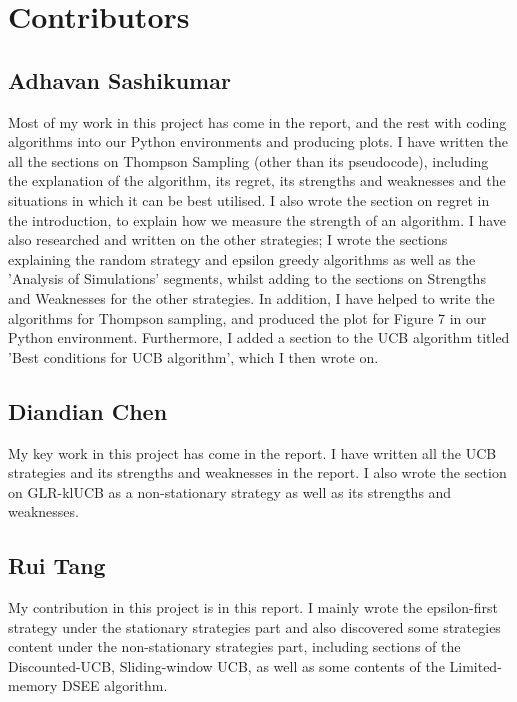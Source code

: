 \section{Contributors}\label{sec:contributors}

\subsection{Adhavan Sashikumar}\label{subsec:adhavan-sashikumar}
Most of my work in this project has come in the report, and the rest with coding algorithms into our Python environments and producing plots.
I have written the all the sections on Thompson Sampling (other than its pseudocode), including the explanation of the algorithm, its regret, its strengths and weaknesses and the situations in which it can be best utilised.
I also wrote the section on regret in the introduction, to explain how we measure the strength of an algorithm.
I have also researched and written on the other strategies;
I wrote the sections explaining the random strategy and epsilon greedy algorithms as well as the 'Analysis of Simulations' segments, whilst adding to the sections on Strengths and Weaknesses for the other strategies.
In addition, I have helped to write the algorithms for Thompson sampling, and produced the plot for Figure 7 in our Python environment.
Furthermore, I added a section to the UCB algorithm titled 'Best conditions for UCB algorithm', which I then wrote on.

\subsection{Diandian Chen}\label{subsec:diandian-chen}
My key work in this project has come in the report.
I have written all the UCB strategies and its strengths and weaknesses in the report.
I also wrote the section on GLR-klUCB as a non-stationary strategy as well as its strengths and weaknesses.

\subsection{Rui Tang}\label{subsec:rui-tang}
My contribution in this project is in this report.
\newline I mainly wrote the epsilon-first strategy under the stationary strategies part and also discovered some strategies content under the non-stationary strategies part, including sections of the Discounted-UCB, Sliding-window UCB, as well as  some contents of the Limited-memory DSEE algorithm.

